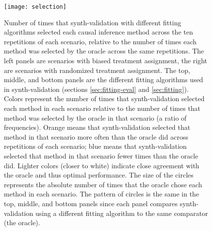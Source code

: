 

\begin{figure}[h!]
\centering
\texttt{[image: selection]} 
\caption{
Number of times that synth-validation with different fitting algorithms selected each causal inference method across the ten repetitions of each scenario, relative to the number of times each method was selected by the oracle across the same repetitions. The left panels are scenarios with biased treatment assignment, the right are scenarios with randomized treatment assignment. The top, middle, and bottom panels are the different fitting algorithms used in synth-validation (sections \ref{sec:fitting-eval} and \ref{sec:fitting}). Colors represent the number of times that synth-validation selected each method in each scenario relative to the number of times that method was selected by the oracle in that scenario (a ratio of frequencies). Orange means that synth-validation selected that method in that scenario more often than the oracle did across repetitions of each scenario; blue means that synth-validation selected that method in that scenario fewer times than the oracle did. Lighter colors (closer to white) indicate close agreement with the oracle and thus optimal performance. The size of the circles represents the absolute number of times that the oracle chose each method in each scenario. The pattern of circles is the same in the top, middle, and bottom panels since each panel compares synth-validation using a different fitting algorithm to the same comparator (the oracle).
}
\label{fig:selection}
\end{figure}

